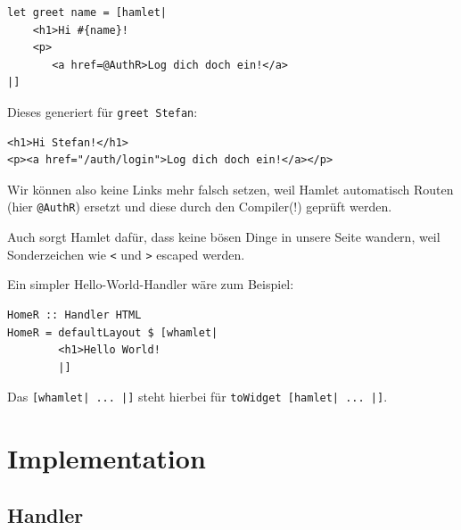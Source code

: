 \documentclass{beamer}
\begin{document}
\begin{frame}[fragile]
\begin{verbatim}
let greet name = [hamlet|
    <h1>Hi #{name}!
    <p>
       <a href=@AuthR>Log dich doch ein!</a>
|]
\end{verbatim}
\pause
Dieses generiert für \texttt{greet \glqq Stefan\grqq}:
\begin{verbatim}
<h1>Hi Stefan!</h1>
<p><a href="/auth/login">Log dich doch ein!</a></p>
\end{verbatim}
\pause
Wir können also keine Links mehr falsch setzen, weil Hamlet automatisch Routen (hier \texttt{@AuthR}) ersetzt und diese durch den Compiler(!) geprüft werden.\\\pause\par
Auch sorgt Hamlet dafür, dass keine bösen Dinge in unsere Seite wandern, weil Sonderzeichen wie \texttt{<} und \texttt{>} escaped werden.
\end{frame}

\begin{frame}[fragile]
Ein simpler Hello-World-Handler wäre zum Beispiel:
\bigskip

\begin{verbatim}
HomeR :: Handler HTML
HomeR = defaultLayout $ [whamlet|
        <h1>Hello World!
        |]
\end{verbatim}
\pause
\bigskip

Das \texttt{[whamlet| ... |]} steht hierbei für \texttt{toWidget [hamlet| ... |]}.
\end{frame}


\section{Implementation}

\subsection{Handler}
\end{document}
